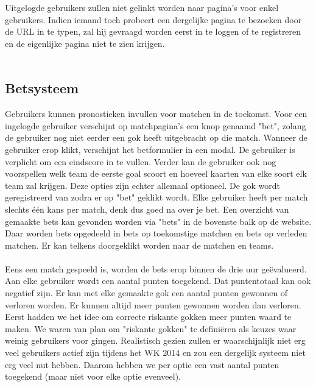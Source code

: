 \documentclass[11pt, a4paper]{article}
\begin{document}
Uitgelogde gebruikers zullen niet gelinkt worden naar pagina's voor enkel gebruikers. Indien iemand toch probeert een dergelijke pagina te bezoeken door de URL in te typen, zal hij gevraagd worden eerst in te loggen of te registreren en de eigenlijke pagina niet te zien krijgen. \\ \\

\subsection{Betsysteem}
Gebruikers kunnen pronostieken invullen voor matchen in de toekomst. Voor een ingelogde gebruiker verschijnt op matchpagina's een knop genaamd "bet", zolang de gebruiker nog niet eerder een gok heeft uitgebracht op die match. Wanneer de gebruiker erop klikt, verschijnt het betformulier in een modal. De gebruiker is verplicht om een eindscore in te vullen. Verder kan de gebruiker ook nog voorspellen welk team de eerste goal scoort en hoeveel kaarten van elke soort elk team zal krijgen. Deze opties zijn echter allemaal optioneel. De gok wordt geregistreerd van zodra er op "bet" geklikt wordt. Elke gebruiker heeft per match slechts \'e\'en kans per match, denk dus goed na over je bet. Een overzicht van gemaakte bets kan gevonden worden via "bets" in de bovenste balk op de website. Daar worden bets opgedeeld in bets op toekomstige matchen en bets op verleden matchen. Er kan telkens doorgeklikt worden naar de matchen en teams. \\ \\
Eens een match gespeeld is, worden de bets erop binnen de drie uur ge\"evalueerd. Aan elke gebruiker wordt een aantal punten toegekend. Dat puntentotaal kan ook negatief zijn. Er kan met elke gemaakte gok een aantal punten gewonnen of verloren worden. Er kunnen altijd meer punten gewonnen worden dan verloren. Eerst hadden we het idee om correcte riskante gokken meer punten waard te maken. We waren van plan om "riskante gokken" te defini\"eren als keuzes waar weinig gebruikers voor gingen. Realistisch gezien zullen er waarschijnlijk niet erg veel gebruikers actief zijn tijdens het WK 2014 en zou een dergelijk systeem niet erg veel nut hebben. Daarom hebben we per optie een vast aantal punten toegekend (maar niet voor elke optie evenveel). \\ \\
\end{document}
